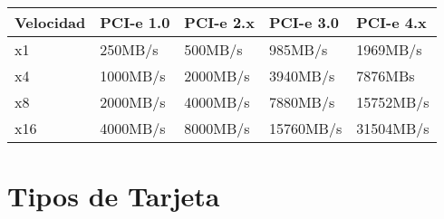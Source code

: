 \documentclass[11pt]{article}
\begin{document}
\begin{center}
\begin{tabular}{lllll}
Velocidad & PCI-e 1.0 & PCI-e 2.x & PCI-e 3.0 & PCI-e 4.x\\
\hline
x1 & 250MB/s & 500MB/s & 985MB/s & 1969MB/s\\
x4 & 1000MB/s & 2000MB/s & 3940MB/s & 7876MBs\\
x8 & 2000MB/s & 4000MB/s & 7880MB/s & 15752MB/s\\
x16 & 4000MB/s & 8000MB/s & 15760MB/s & 31504MB/s\\
\end{tabular}
\end{center}


\section{Tipos de Tarjeta}
\label{sec:org66f2c42}
\end{document}
